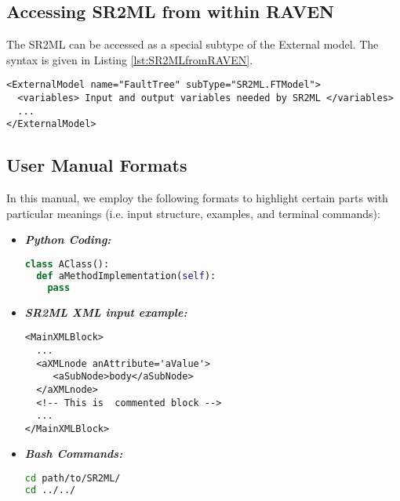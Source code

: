 \subsection{Accessing SR2ML from within RAVEN}
The SR2ML can be accessed as a special subtype of the External model.
The syntax is given in Listing \ref{lst:SR2MLfromRAVEN}.

\begin{lstlisting}[style=XML,morekeywords={anAttribute},caption=Call SR2ML.FTModel from RAVEN input., label=lst:SR2MLfromRAVEN]
<ExternalModel name="FaultTree" subType="SR2ML.FTModel">
  <variables> Input and output variables needed by SR2ML </variables>
  ...
</ExternalModel>
\end{lstlisting}

\subsection{User Manual Formats}
In this manual, we employ the following formats to highlight certain parts with
particular meanings (i.e. input structure, examples, and terminal commands):

\begin{itemize}
\item \textbf{\textit{Python Coding:}}
\begin{lstlisting}[language=python]
class AClass():
  def aMethodImplementation(self):
    pass
\end{lstlisting}
\item \textbf{\textit{SR2ML XML input example:}}
\begin{lstlisting}[style=XML,morekeywords={anAttribute}]
<MainXMLBlock>
  ...
  <aXMLnode anAttribute='aValue'>
     <aSubNode>body</aSubNode>
  </aXMLnode>
  <!-- This is  commented block -->
  ...
</MainXMLBlock>
\end{lstlisting}
\item \textbf{\textit{Bash Commands:}}
\begin{lstlisting}[language=bash]
cd path/to/SR2ML/
cd ../../
\end{lstlisting}
\end{itemize}

